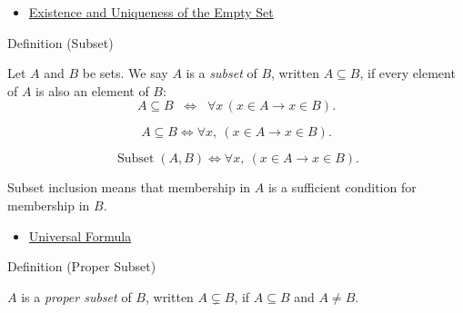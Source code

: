 \begin{dependencies}
\begin{itemize}
  \item \hyperref[thm:empty-set-exists-unique]{Existence and Uniqueness of the Empty Set}
\end{itemize}
\end{dependencies}

\begin{definitionbox}{Definition (Subset)}
\begin{definition}[Subset]\label{def:subset}
Let $A$ and $B$ be sets. We say $A$ is a \emph{subset} of $B$, written
$A \subseteq B$, if every element of $A$ is also an element of $B$:
\[
A \subseteq B \;\;\Longleftrightarrow\;\; \forall x \, (x \in A \rightarrow x \in B).
\]
\end{definition}
\end{definitionbox}

\begin{remark*}
\[
  A\subseteq B
  \iff
  \forall x,\ (x\in A\to x\in B).
\]
\end{remark*}

\begin{remark*}
\[
  \operatorname{Subset}(A,B)
  \iff
  \forall x,\ (x\in A\to x\in B).
\]
\end{remark*}

\begin{remark*}[Interpretation]
Subset inclusion means that membership in $A$ is a sufficient condition for
membership in $B$.
\end{remark*}

\begin{dependencies}
\begin{itemize}
  \item \hyperref[def:universal-q]{Universal Formula}
\end{itemize}
\end{dependencies}

\begin{definitionbox}{Definition (Proper Subset)}
\begin{definition}\label{def:proper-subset}
$A$ is a \emph{proper subset} of $B$, written $A \subsetneq B$, if
$A \subseteq B$ and $A \neq B$.
\end{definition}
\end{definitionbox}

